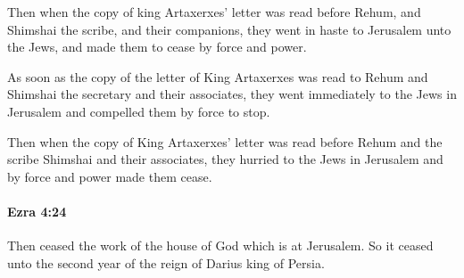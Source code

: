 			\begin{versebox}
					\item[BHS] 
					\item[LXX] 
					\item[ASV] Then when the copy of king Artaxerxes' letter was read before Rehum, and Shimshai the scribe, and their companions, they went in haste to Jerusalem unto the Jews, and made them to cease by force and power.
					\item[NIV] As soon as the copy of the letter of King Artaxerxes was read to Rehum and Shimshai the secretary and their associates, they went immediately to the Jews in Jerusalem and compelled them by force to stop.
					\item[NRSV] Then when the copy of King Artaxerxes’ letter was read before Rehum and the scribe Shimshai and their associates, they hurried to the Jews in Jerusalem and by force and power made them cease.
			\end{versebox}

		\paragraph{Ezra 4:24} %
			\label{EZRA-4-24}

			Then ceased the work of the house of God which is at Jerusalem. So it ceased unto the second year of the reign of Darius king of Persia.

